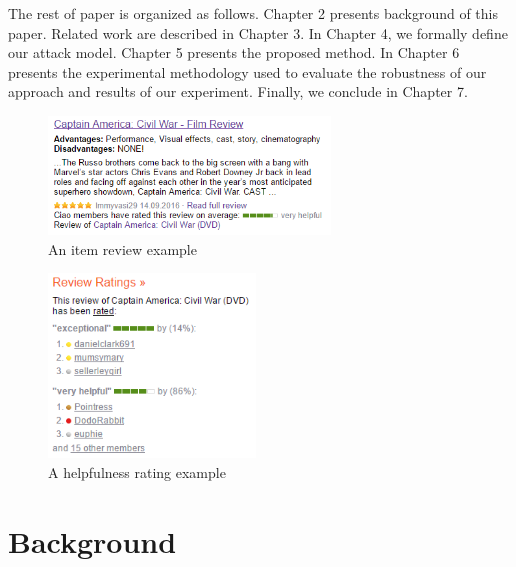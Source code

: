 \documentclass[master,english,final]{kaist-ucs}
\begin{document}
The rest of paper is organized as follows.
Chapter 2 presents background of this paper.
Related work are described in Chapter 3.
In Chapter 4, we formally define our attack model.
Chapter 5 presents the proposed method.
In Chapter 6 presents the experimental methodology used to evaluate the robustness of our approach and results of our experiment.
Finally, we conclude in Chapter 7.


\begin{figure}[h]
    \centerline{\includegraphics[width=7.5cm]{figure/item_review_example}}
    \caption{ An item review example    } \label{item_review_example}
\end{figure}

\begin{figure}[h]
    \centerline{\includegraphics[width=5.5cm]{figure/helpfulness_rating_example}}
    \caption{ A helpfulness rating example    } \label{helpfulness_rating_example}
\end{figure}

\chapter{Background}
\end{document}
